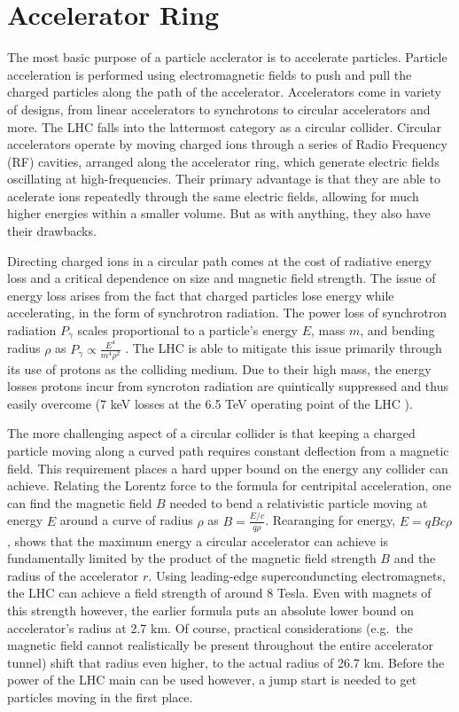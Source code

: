 \section{Accelerator Ring}
    The most basic purpose of a particle acclerator is to accelerate particles.
    Particle acceleration is performed using electromagnetic fields to push and pull the charged particles along the path of the accelerator.
    Accelerators come in variety of designs, from linear accelerators to synchrotons to circular accelerators and more.
    The LHC falls into the lattermost category as a circular collider.
    Circular accelerators operate by moving charged ions through a series of Radio Frequency (RF) cavities, arranged along the accelerator ring, which generate electric fields oscillating at high-frequencies.
    Their primary advantage is that they are able to acelerate ions repeatedly through the same electric fields, allowing for much higher energies within a smaller volume.
    But as with anything, they also have their drawbacks.

    Directing charged ions in a circular path comes at the cost of radiative energy loss and a critical dependence on size and magnetic field strength.
    The issue of energy loss arises from the fact that charged particles lose energy while accelerating, in the form of synchrotron radiation.
    The power loss of synchrotron radiation $P_\gamma$ scales proportional to a particle's energy $E$, mass $m$, and bending radius $\rho$ as $P_\gamma \propto \frac{E^4}{m^4 \rho^2}$ \cite{2007_Book_ParticleAcceleratorPhysics}.
    The LHC is able to mitigate this issue primarily through its use of protons as the colliding medium.
    Due to their high mass, the energy losses protons incur from syncroton radiation are quintically suppressed and thus easily overcome (7 keV losses at the 6.5 TeV operating point of the LHC \cite{lhc_machine}). %

    The more challenging aspect of a circular collider is that keeping a charged particle moving along a curved path requires constant deflection from a magnetic field.
    This requirement places a hard upper bound on the energy any collider can achieve.
    Relating the Lorentz force to the formula for centripital acceleration, one can find the magnetic field $B$ needed to bend a relativistic particle moving at energy $E$ around a curve of radius $\rho$ as $B=\frac{E/c}{q \rho}$.
    Rearanging for energy, $E = q B c \rho$, shows that the maximum energy a circular accelerator can achieve is fundamentally limited by the product of the magnetic field strength $B$ and the radius of the accelerator $r$.
    Using leading-edge superconduncting electromagnets, the LHC can achieve a field strength of around 8 Tesla.
    Even with magnets of this strength however, the earlier formula puts an absolute lower bound on accelerator's radius at 2.7 km.
    Of course, practical considerations (e.g.\ the magnetic field cannot realistically be present throughout the entire accelerator tunnel) shift that radius even higher, to the actual radius of 26.7 km.
    Before the power of the LHC main can be used however, a jump start is needed to get particles moving in the first place.

